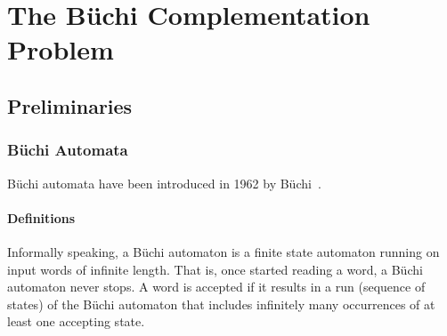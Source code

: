 \documentclass{scrreprt}
\begin{document}




\chapter{The Büchi Complementation Problem}
\section{Preliminaries}
\subsection{Büchi Automata}
Büchi automata have been introduced in 1962 by Büchi~\cite{buchi1960decision}. 

\subsubsection{Definitions}
Informally speaking, a Büchi automaton is a finite state automaton running on input words of infinite length. That is, once started reading a word, a Büchi automaton never stops. A word is accepted if it results in a run (sequence of states) of the Büchi automaton that includes infinitely many occurrences of at least one accepting state.
\end{document}
